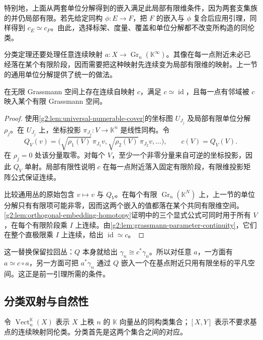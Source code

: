 特别地，上面从两套单位分解得到的嵌入满足此局部有限维条件，因为两套支集族的并仍局部有限。若先给定同构 \(\phi:E\to F\)，把 \(F\) 的嵌入与 \(\phi\) 复合后应用引理，同样得到 \(c_E\simeq c_F\)。由此，选择标架、度量、覆盖和单位分解都不改变所构造的同伦类。

\ProseParagraphBreak

分类定理还要处理任意连续映射 \(a:X\to\operatorname{Gr}_n(\mathbb K^\infty)\)。其像在每一点附近未必已经落在某个有限阶段，因而需要把这种映射先连续变为局部有限维的映射。上一节的通用单位分解提供了统一的做法。

\begin{lemma}\label{g2:lem:classifier-local-finite-replacement}
	在无限 Grassmann 空间上存在连续自映射 \(c\)，满足 \(c\simeq\operatorname{id}\)，且每一点有邻域被 \(c\) 映入某个有限 Grassmann 空间。
\end{lemma}
\begin{proof}
	使用\cref{g2:lem:universal-numerable-cover}的坐标图 \(U_{J_j}\) 及局部有限单位分解 \(\rho_j\)。在 \(U_{J_j}\) 上，坐标投影 \(\pi_{J_j}:V\to\mathbb K^n\) 是线性同构。令
	\[
		Q_V(v)=\bigl(\sqrt{\rho_1(V)}\,\pi_{J_1}v,
		\sqrt{\rho_2(V)}\,\pi_{J_2}v,\ldots\bigr),\qquad
		c(V)=Q_V(V).
	\]
	在 \(\rho_j=0\) 处该分量取零。对每个 \(V\)，至少一个非零分量来自可逆的坐标投影，因此 \(Q_V\) 单射。局部有限性说明 \(c\) 在每一点附近落入固定有限阶段，有限维投影矩阵公式保证连续。

	比较通用丛的原始包含 \(v\mapsto v\) 与 \(Q_V\)。在每个有限 \(\operatorname{Gr}_n(\mathbb K^N)\) 上，上一节的单位分解只有有限项可能非零，因而这两个嵌入的值都落在某个共同有限维空间。\cref{g2:lem:orthogonal-embedding-homotopy}证明中的三个显式公式可同时用于所有 \(V\)，在每个有限阶段乘 \(I\) 上连续。由\cref{g2:lem:grassmann-parameter-continuity}，它们在整个直极限乘 \(I\) 上连续，给出 \(\operatorname{id}\simeq c\)。
\end{proof}

这一替换保留拉回丛：\(Q\) 本身就给出 \(\gamma_n\cong c^*\gamma_n\)。所以对任意 \(a\)，一方面有 \(a\simeq c\circ a\)，另一方面可把 \(a^*\gamma_n\) 通过 \(Q\) 嵌入一个在基点附近只用有限坐标的平凡空间。这正是前一引理所需的条件。

\subsection{分类双射与自然性}
\label{g2:subsec:1903:03}
令 \(\operatorname{Vect}^{\mathbb K}_n(X)\) 表示 \(X\) 上秩 \(n\) 的 \(\mathbb K\) 向量丛的同构类集合；\([X,Y]\) 表示不要求基点的连续映射同伦类。分类首先是这两个集合之间的对应。

